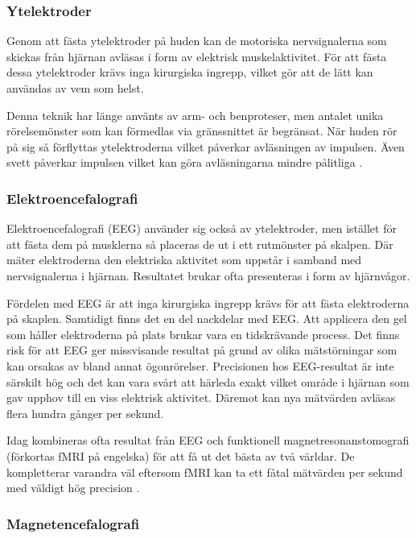 \documentclass[12pt, a4paper]{article}
\begin{document}
\subsubsection{Ytelektroder}

Genom att fästa ytelektroder på huden kan de motoriska nervsignalerna som
skickas från hjärnan avläsas i form av elektrisk muskelaktivitet. För att fästa
dessa ytelektroder krävs inga kirurgiska ingrepp, vilket gör att de lätt kan
användas av vem som helst.

Denna teknik har länge använts av arm- och benproteser, men antalet unika
rörelsemönster som kan förmedlas via gränssnittet är begränsat. När huden rör på
sig så förflyttas ytelektroderna vilket påverkar avläsningen av impulsen. Även
svett påverkar impulsen vilket kan göra avläsningarna mindre pålitliga
\cite{prosthetic_operation}.

\subsubsection{Elektroencefalografi}

Elektroencefalografi (EEG) använder sig också av ytelektroder, men istället för
att fästa dem på musklerna så placeras de ut i ett rutmönster på skalpen. Där
mäter elektroderna den elektriska aktivitet som uppstår i samband med
nervsignalerna i hjärnan. Resultatet brukar ofta presenteras i form av
hjärnvågor.

Fördelen med EEG är att inga kirurgiska ingrepp krävs för att fästa elektroderna
på skaplen. Samtidigt finns det en del nackdelar med EEG. Att applicera den gel
som håller elektroderna på plats brukar vara en tidskrävande process. Det finns
risk för att EEG ger missvisande resultat på grund av olika mätstörningar som
kan orsakas av bland annat ögonrörelser. Precisionen hos EEG-resultat är inte
särskilt hög och det kan vara svårt att härleda exakt vilket område i hjärnan
som gav upphov till en viss elektrisk aktivitet. Däremot kan nya mätvärden
avläsas flera hundra gånger per sekund.


Idag kombineras ofta resultat från EEG och funktionell magnetresonanstomografi
(förkortas fMRI på engelska) för att få ut det bästa av två världar. De
kompletterar varandra väl eftersom fMRI kan ta ett fåtal mätvärden per sekund
med väldigt hög precision \cite{eeg_fmri}.

\subsubsection{Magnetencefalografi}
\label{meg}
\end{document}
